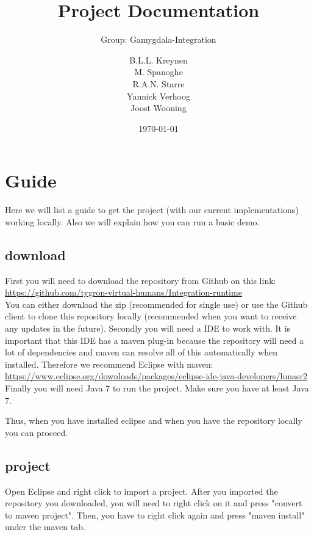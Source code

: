 \documentclass{scrartcl}
\begin{document}
\title{Project Documentation}
\subtitle{Group: Gamygdala-Integration}
\date{\today{}}

\author{
    \begin{tabular}{l r}
      B.L.L. Kreynen\\
      M. Spanoghe\\
      R.A.N. Starre\\
      Yannick Verhoog\\
      Joost Wooning\\
    \end{tabular}
}

\maketitle \thispagestyle{empty} \pagebreak

\section{Guide}
Here we will list a guide to get the project (with our current implementations) working locally. Also we will explain how you can run a basic demo.

\subsection{download}
First you will need to download the repository from Github on this link: \\
\url{https://github.com/tygron-virtual-humans/Integration-runtime}\\
You can either download the zip (recommended for single use) or use the Github client to clone this repository locally (recommended when you want to receive any updates in the future).
Secondly you will need a IDE to work with. It is important that this IDE has a maven plug-in because the repository will need a lot of dependencies and maven can resolve all of this automatically when installed. Therefore we recommend Eclipse with maven:\\
\url{https://www.eclipse.org/downloads/packages/eclipse-ide-java-developers/lunasr2}
Finally you will need Java 7 to run the project. Make sure you have at least Java 7.

Thus, when you have installed eclipse and when you have the repository locally you can proceed.

\subsection{project}
Open Eclipse and right click to import a project. After you imported the repository you downloaded, you will need to right click on it and press "convert to maven project". Then, you have to right click again and press "maven install" under the maven tab.
\end{document}
